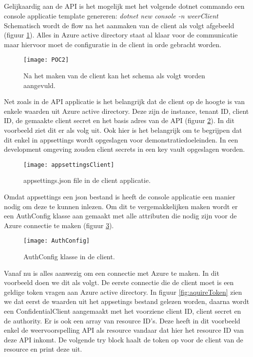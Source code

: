 \subsection{}
Gelijkaardig aan de API is het mogelijk met het volgende dotnet commando een console applicatie template genereren: \emph{dotnet new console -n weerClient}\newline
Schematisch wordt de flow na het aanmaken van de client als volgt afgebeeld (figuur \ref{fig:poc2}). Alles in Azure active directory staat al klaar voor de communicatie maar hiervoor moet de configuratie in de client in orde gebracht worden.
\begin{figure}[H]
	\centering
	\texttt{[image: POC2]} 
	\caption[POC2]{Na het maken van de client kan het schema als volgt worden aangevuld.}
	\label{fig:poc2}
\end{figure}
Net zoals in de API applicatie is het belangrijk dat de client op de hoogte is van enkele waarden uit Azure active directory. Deze zijn de instance, tenant ID, client ID, de gemaakte client secret en het basis adres van de API (figuur \ref{fig:appsettingsClient}). In dit voorbeeld ziet dit er als volg uit. Ook hier is het belangrijk om te begrijpen dat dit enkel in appsettings wordt opgeslagen voor demonstratiedoeleinden. In een development omgeving zouden client secrets in een key vault opgeslagen worden.
\begin{figure}[H]
	\centering
	\texttt{[image: appsettingsClient]} 
	\caption[POC2]{appsettings.json file in de client applicatie.}
	\label{fig:appsettingsClient}
\end{figure}
Omdat appsettings een json bestand is heeft de console applicatie een manier nodig om deze te kunnen inlezen. Om dit te vergemakkelijken maken wordt er een AuthConfig klasse aan gemaakt met alle attributen die nodig zijn voor de Azure connectie te maken (figuur \ref{fig:authConfig}).
\begin{figure}[H]
	\centering
	\texttt{[image: AuthConfig]} 
	\caption[AuthConfig]{AuthConfig klasse in de client.}
	\label{fig:authConfig}
\end{figure}\newpage
Vanaf nu is alles aanwezig om een connectie met Azure te maken. In dit voorbeeld doen we dit als volgt. De eerste connectie die de client moet is een geldige token vragen aan Azure active directory. In figuur \ref{fig:aquireToken} zien we dat eerst de waarden uit het appsetings bestand gelezen worden, daarna wordt een ConfidentialClient aangemaakt met het voorziene client ID, client secret en de authority. Er is ook een array van resource ID’s. Deze heeft in dit voorbeeld enkel de weervoorspelling API als resource vandaar dat hier het resource ID van deze API inkomt. De volgende try block haalt de token op voor de client van de resource en print deze uit.
